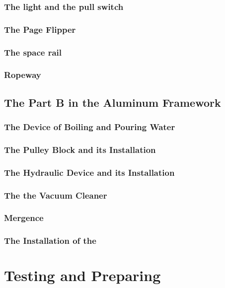 \documentclass[twoside,a4paper]{refart}
\begin{document}
\subsubsection{The light and the pull switch}
\subsubsection{The Page Flipper}
\subsubsection{The space rail}
\subsubsection{Ropeway}
\subsection{The Part B in the Aluminum Framework}
\subsubsection{The Device of Boiling and Pouring Water}
\subsubsection{The Pulley Block and its Installation}
\subsubsection{The Hydraulic Device and its Installation}
\subsubsection{The the Vacuum Cleaner}
\subsubsection{Mergence}
\subsubsection{The Installation of the}
\section{Testing and Preparing}
\newpage
\end{document}
